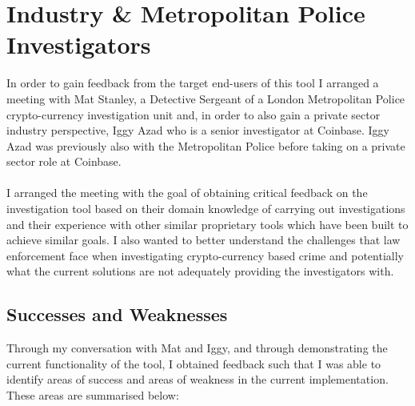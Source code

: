 \section{Industry \& Metropolitan Police Investigators} 
In order to gain feedback from the target end-users of this tool I arranged a meeting with Mat Stanley, a Detective Sergeant of a London Metropolitan Police crypto-currency investigation unit and, in order to also gain a private sector industry perspective, Iggy Azad who is a senior investigator at Coinbase. Iggy Azad was previously also with the Metropolitan Police before taking on a private sector role at Coinbase. 
\\\\
I arranged the meeting with the goal of obtaining critical feedback on the investigation tool based on their domain knowledge of carrying out investigations and their experience with other similar proprietary tools which have been built to achieve similar goals. I also wanted to better understand the challenges that law enforcement face when investigating crypto-currency based crime and potentially what the current solutions are not adequately providing the investigators with. 

\subsection{Successes and Weaknesses}
Through my conversation with Mat and Iggy, and through demonstrating the current functionality of the tool, I obtained feedback such that I was able to identify areas of success and areas of weakness in the current implementation. These areas are summarised below:

